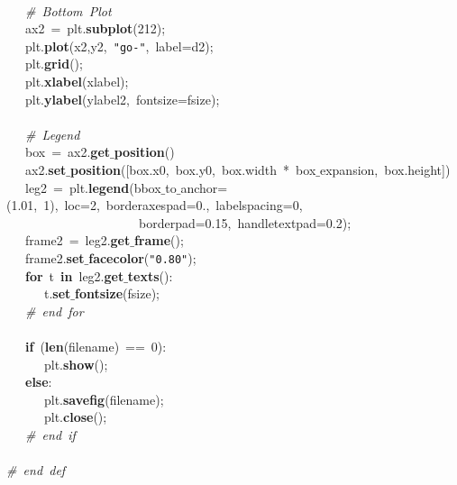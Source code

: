 \mbox{}\ \ \  \\
\mbox{}\ \ \ \textit{\#\ Bottom\ Plot} \\
\mbox{}\ \ \ ax2\ =\ plt.\textbf{subplot}(212); \\
\mbox{}\ \ \ plt.\textbf{plot}(x2,y2,\ \texttt{"{}go-"{}},\ label=d2); \\
\mbox{}\ \ \ plt.\textbf{grid}(); \\
\mbox{}\ \ \ plt.\textbf{xlabel}(xlabel); \\
\mbox{}\ \ \ plt.\textbf{ylabel}(ylabel2,\ fontsize=fsize); \\
\mbox{}\ \ \  \\
\mbox{}\ \ \ \textit{\#\ Legend} \\
\mbox{}\ \ \ box\ =\ ax2.\textbf{get$\_$position}() \\
\mbox{}\ \ \ ax2.\textbf{set$\_$position}([box.x0,\ box.y0,\ box.width\ *\ box$\_$expansion,\ box.height]) \\
\mbox{}\ \ \ leg2\ =\ plt.\textbf{legend}(bbox$\_$to$\_$anchor=(1.01,\ 1),\ loc=2,\ borderaxespad=0.,\ labelspacing=0,\  \\
\mbox{}\ \ \ \ \ \ \ \ \ \ \ \ \ \ \ \ \ \ \ \ \ borderpad=0.15,\ handletextpad=0.2); \\
\mbox{}\ \ \ frame2\ =\ leg2.\textbf{get$\_$frame}(); \\
\mbox{}\ \ \ frame2.\textbf{set$\_$facecolor}(\texttt{"{}0.80"{}}); \\
\mbox{}\ \ \ \textbf{for}\ t\ \textbf{in}\ leg2.\textbf{get$\_$texts}(): \\
\mbox{}\ \ \ \ \ \ t.\textbf{set$\_$fontsize}(fsize); \\
\mbox{}\ \ \ \textit{\#\ end\ for} \\
\mbox{}\ \ \  \\
\mbox{}\ \ \ \textbf{if}\ (\textbf{len}(filename)\ ==\ 0): \\
\mbox{}\ \ \ \ \ \ plt.\textbf{show}(); \\
\mbox{}\ \ \ \textbf{else}: \\
\mbox{}\ \ \ \ \ \ plt.\textbf{savefig}(filename); \\
\mbox{}\ \ \ \ \ \ plt.\textbf{close}(); \\
\mbox{}\ \ \ \textit{\#\ end\ if} \\
\mbox{}\ \ \  \\
\mbox{}\textit{\#\ end\ def} \\
\mbox{} \\
\mbox{} \\
\mbox{} \\
